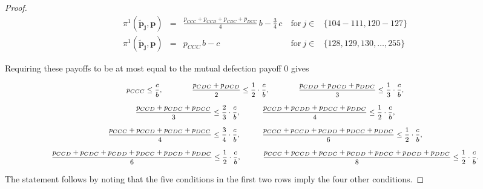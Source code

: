\documentclass[11pt]{article}
\theoremstyle{plainCl1}
\theoremstyle{plainCl2}
\begin{document}
\begin{proof}
\begin{equation*}
\begin{array}{lclll}
  \pi^1(\mathbf{\tilde p_j},\mathbf{p}) &= 
  &\displaystyle \frac{p_{CCC} + p_{CCD} + p_{CDC} + p_{DCC}}{4} \, b - \frac{3}{4} \, c
  &~\text{for}~ j\! \in\! 
  & \{ 104\!-\!111, 120\!- \!127\} \\ [0.2cm]
  
  \pi^1(\mathbf{\tilde p_j},\mathbf{p}) &= 
  &\displaystyle p_{CCC} \, b - c
  &~\text{for}~ j\! \in\! 
  & \{128, 129, 130, \dots, 255\}
  \end{array}
  \end{equation*}
  
  \noindent
  Requiring these payoffs to be at most  equal to the mutual defection payoff 0
  gives

  \begin{equation*} \footnotesize
  \begin{array}{c}
  \displaystyle  p_{CCC} \leq \frac{c}{b}, 
    \qquad \qquad \frac{p_{CDC} + p_{DCD}}{2} \leq \frac{1}{2} \cdot \frac{c}{b}, 
    \qquad \qquad \frac{p_{CDD} + p_{DCD} + p_{DDC}}{3} \leq \frac{1}{3} \cdot \frac{c}{b},\\[0.45cm]
  \displaystyle  \frac{p_{CCD} + p_{CDC} + p_{DCC}}{3} \leq \frac{2}{3} \cdot \frac{c}{b},
    \quad \qquad \frac{p_{CCD} + p_{CDD} + p_{DCC} + p_{DDC}}{4} \leq \frac{1}{2}  \cdot \frac{c}{b}, \\[0.45cm]
    \displaystyle  \frac{p_{CCC} + p_{CCD} + p_{CDC} + p_{DCC}}{4} \leq \frac{3}{4} \cdot \frac{c}{b},
    \quad \qquad \frac{p_{CCC} + p_{CCD} + p_{CDD} + p_{DCC} + p_{DDC}}{6} \leq \frac{1}{2}  \cdot \frac{c}{b}, \\[0.45cm]
    \displaystyle  \frac{p_{CCD} + p_{CDC} + p_{CDD} + p_{DCC} + p_{DCD} + p_{DDC}}{6} \leq \frac{1}{2}  \cdot \frac{c}{b},
    \quad \qquad \frac{p_{CCC} + p_{CCD} + p_{CDC} +  p_{CDD} + p_{DCC} +  p_{DCD} + p_{DDC}}{8} \leq \frac{1}{2}  \cdot \frac{c}{b}.
    \end{array}
  \end{equation*}

  \noindent
  The statement follows by noting that the five conditions in the first two rows imply the four other conditions.
\end{proof}
 
\end{document}
